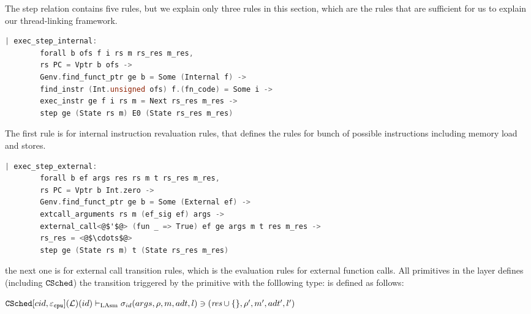The step relation contains five rules, 
but we explain only three rules in this section, which are the rules 
that are sufficient for us to explain our thread-linking framework.
\begin{lstlisting}[language=C, deletekeywords={unsigned}]
    | exec_step_internal:
        forall b ofs f i rs m rs_res m_res,
        rs PC = Vptr b ofs ->
        Genv.find_funct_ptr ge b = Some (Internal f) ->
        find_instr (Int.unsigned ofs) f.(fn_code) = Some i ->
        exec_instr ge f i rs m = Next rs_res m_res ->
        step ge (State rs m) E0 (State rs_res m_res)
\end{lstlisting}
The first rule is for internal instruction revaluation rules, 
that defines the rules for bunch of possible instructions including 
memory load and stores. 
\begin{lstlisting}[language=C]
    | exec_step_external:
        forall b ef args res rs m t rs_res m_res,
        rs PC = Vptr b Int.zero ->
        Genv.find_funct_ptr ge b = Some (External ef) ->
        extcall_arguments rs m (ef_sig ef) args ->
        external_call<@$'$@> (fun _ => True) ef ge args m t res m_res ->
        rs_res = <@$\cdots$@>
        step ge (State rs m) t (State rs_res m_res)
\end{lstlisting}
the next one is for external call transition rules, which is
the evaluation rules for external function calls.
All primitives in the layer defines (including ${{\mathrm{\texttt{CSched}}}}$) the transition triggered by the primitive with the folllowing type: 
is defined as follows:
\begin{center}
${{\mathrm{\texttt{CSched}}}}[cid, {\varepsilon}_{{\mathrm{\texttt{cpu}}}}](\mathcal{L})(id)
 \vdash_{\mathrm{LAsm}}  \sigma_{id}(args, \rho, m, adt, l) \ni (\textit{res}\cup \{\}, \rho',  m', adt', l')$
\end{center}
